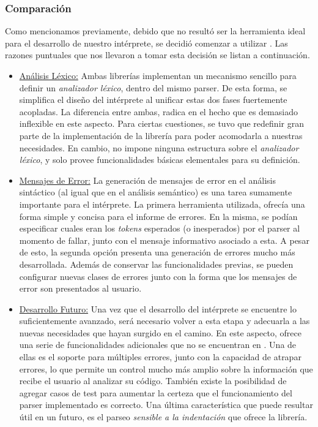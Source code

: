 \subsubsection{Comparación}

Como mencionamos previamente, debido que \Parsec{} no resultó ser la herramienta ideal para el desarrollo de nuestro intérprete, se decidió comenzar a utilizar \Megaparsec{}.
Las razones puntuales que nos llevaron a tomar esta decisión se listan a continuación.
\begin{itemize}
    \item \underline{Análisis Léxico:}
    Ambas librerías implementan un mecanismo sencillo para definir un \textit{analizador léxico}, dentro del mismo parser.
    De esta forma, se simplifica el diseño del intérprete al unificar estas dos fases fuertemente acopladas.
    La diferencia entre ambas, radica en el hecho que \Parsec{} es demasiado inflexible en este aspecto.
    Para ciertas cuestiones, se tuvo que redefinir gran parte de la implementación de la librería para poder acomodarla a nuestras necesidades.
    En cambio, \Megaparsec{} no impone ninguna estructura sobre el \textit{analizador léxico}, y solo provee funcionalidades básicas elementales para su definición.
    \item \underline{Mensajes de Error:}
    La generación de mensajes de error en el análisis sintáctico (al igual que en el análisis semántico) es una tarea sumamente importante para el intérprete.
    La primera herramienta utilizada, ofrecía una forma simple y concisa para el informe de errores.
    En la misma, se podían especificar cuales eran los \textit{tokens} esperados (o inesperados) por el parser al momento de fallar, junto con el mensaje informativo asociado a esta.
    A pesar de esto, la segunda opción presenta una generación de errores mucho más desarrollada.
    Además de conservar las funcionalidades previas, se pueden configurar nuevas clases de errores junto con la forma que los mensajes de error son presentados al usuario.
    \item \underline{Desarrollo Futuro:}
    Una vez que el desarrollo del intérprete se encuentre lo suficientemente avanzado, será necesario volver a esta etapa y adecuarla a las nuevas necesidades que hayan surgido en el camino.
    En este aspecto, \Megaparsec{} ofrece una serie de funcionalidades adicionales que no se encuentran en \Parsec{}.
    Una de ellas es el soporte para múltiples errores, junto con la capacidad de atrapar errores, lo que permite un control mucho más amplio sobre la información que recibe el usuario al analizar su código.
    También existe la posibilidad de agregar casos de test para aumentar la certeza que el funcionamiento del parser implementado es correcto.
    Una última característica que puede resultar útil en un futuro, es el parseo \textit{sensible a la indentación} que ofrece la librería.
\end{itemize}

